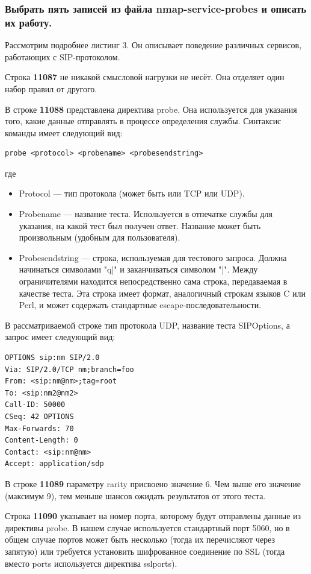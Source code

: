 \documentclass[a4paper, 12pt]{article}		%
\begin{document}
\subsubsection{Выбрать пять записей из файла nmap-service-probes и описать их работу.}

Рассмотрим подробнее листинг 3. Он описывает поведение различных сервисов, работающих с SIP-протоколом.

Строка \textbf{11087} не никакой смысловой нагрузки не несёт. Она отделяет один набор правил от другого.

В строке \textbf{11088} представлена директива probe. Она используется для указания того, какие данные отправлять в процессе определения службы. Синтаксис команды имеет следующий вид:
\begin{Verbatim}[frame=single]
probe <protocol> <probename> <probesendstring> 
\end{Verbatim}
где
\begin{itemize}
  \item Protocol — тип протокола (может быть или TCP или UDP).
  \item Probename — название теста. Используется в отпечатке службы для указания, на какой тест был получен ответ. Название может быть произвольным (удобным для пользователя). 
  \item Probesendstring — строка, используемая для тестового запроса. Должна начинаться символами "q|" и заканчиваться символом "|". Между ограничителями находится непосредственно сама строка, передаваемая в качестве теста. Эта строка имеет формат, аналогичный строкам языков C или Perl, и может содержать стандартные escape-последовательности.
\end{itemize}

В рассматриваемой строке тип протокола UDP, название теста SIPOptions, а запрос имеет следующий вид:
\begin{Verbatim}[frame=single]
OPTIONS sip:nm SIP/2.0
Via: SIP/2.0/TCP nm;branch=foo
From: <sip:nm@nm>;tag=root
To: <sip:nm2@nm2>
Call-ID: 50000
CSeq: 42 OPTIONS
Max-Forwards: 70
Content-Length: 0
Contact: <sip:nm@nm>
Accept: application/sdp

\end{Verbatim}

В строке \textbf{11089} параметру rarity присвоено значение 6. Чем выше его значение (максимум 9), тем меньше шансов ожидать результатов от этого теста.

Строка \textbf{11090} указывает на номер порта, которому будут отправлены данные из директивы probe. В нашем случае используется стандартный порт 5060, но  в общем случае портов может быть несколько (тогда их перечисляют через запятую) или требуется установить шифрованное соединение по SSL (тогда вместо ports используется директива sslports).
\end{document}
